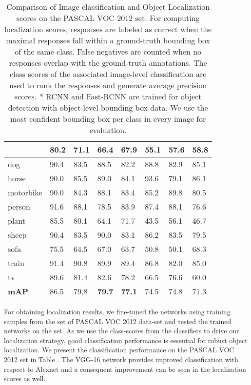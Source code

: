 \documentclass[runningheads]{llncs}
\begin{document}
\begin{table}[]
\begin{tabular}{|L|L|L|L|L|L|L|L|}
 & 80.2 & 71.1 & 66.4 & 67.9 & 55.1 & 57.6 & 58.8 \\ \hline
dog & 90.4 & 83.5 & 88.5 & 82.2 & 88.8 & 82.9 & 85.1 \\ \hline
horse & 90.0 & 85.5 & 89.0 & 84.1 & 93.6 & 79.1 & 86.1 \\ \hline
motorbike & 90.0 & 84.3 & 88.1 & 83.4 & 85.2 & 89.8 & 80.5 \\ \hline
person & 91.6 & 88.1 & 78.5 & 83.9 & 87.4 & 88.1 & 76.6 \\ \hline
plant & 85.5 & 80.1 & 64.1 & 71.7 & 43.5 & 56.1 & 46.7 \\ \hline
sheep & 90.4 & 83.5 & 90.0 & 83.1 & 86.2 & 83.5 & 79.5 \\ \hline
sofa & 75.5 & 64.5 & 67.0 & 63.7 & 50.8 & 50.1 & 68.3 \\ \hline
train & 91.4 & 90.8 & 89.9 & 89.4 & 86.8 & 82.0 & 85.0 \\ \hline
tv & 89.6 & 81.4 & 82.6 & 78.2 & 66.5 & 76.6 & 60.0 \\ \hline
\textbf{mAP} & 86.5 & 79.8 & \textbf{79.7} & \textbf{77.1} & 74.5 & 74.8 & 71.3 \\ \hline
\end{tabular}
\caption{Comparison of Image classification and Object Localization scores on the PASCAL VOC 2012  set. For computing localization scores, responses are labeled as correct when the maximal responses fall within a ground-truth bounding box of the same class. False negatives are counted when no responses overlap with the ground-truth annotations. The class scores of the associated image-level classification are used to rank the responses and generate average precision scores. * RCNN and Fast-RCNN are trained for object detection with object-level bounding box data. We use the most confident bounding box per class in every image for evaluation.}
\label{table:localizationVOC2012}

\end{table}


 For obtaining localization results, we fine-tuned the networks using training samples from the  set of PASCAL VOC 2012 data-set and tested the trained networks on the  set. As we use the class-scores from the classifiers to drive our localization strategy, good classification performance is essential for robust object localization. We present the classification performance on the PASCAL VOC 2012  set in Table . The VGG-16 network provides improved classification with respect to Alexnet and a consequent improvement can be seen in the localization scores as well.
\end{document}
